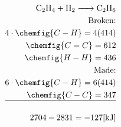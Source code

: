 \documentclass[12pt]{article}
\begin{document}
\begin{enumerate}
    \begin{enumerate}


        \begin{equation}
          \begin{split}
            \ce{C2H4 + H2 -> C2H6}\\
            \text{Broken:}\\
            4\cdot\chemfig{C-H}=4(414)\\
            \chemfig{C=C}=612\\
            \chemfig{H-H}=436\\
            \text{Made:}\\
            6\cdot\chemfig{C-H}=6(414)\\
            \chemfig{C-C}=347\\
            \hline\\
            2704-2831=-127[\si{\kilo\joule}]\\
          \end{split}
          \label{8}
        \end{equation}

    \end{enumerate}

\end{enumerate}
\end{document}

